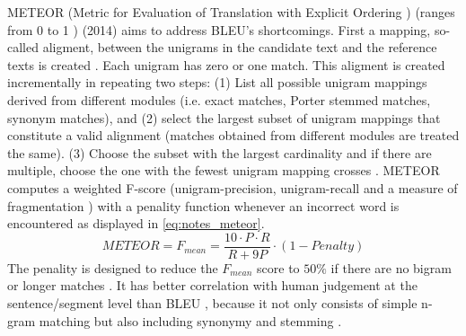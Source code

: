 METEOR (Metric for Evaluation of Translation with Explicit Ordering \cite{palivela_optimization_2021,banerjee_METEOR_2005}) 
(ranges from 0 to 1 \cite{kurt_pehlivanoglu_comparative_2024}) (2014) aims to address BLEU's shortcomings.
First a mapping, so-called aligment, between the unigrams in the candidate text and the reference texts is created \cite{banerjee_METEOR_2005}.
Each unigram has zero or one match.
This aligment is created incrementally in repeating two steps:
(1) List all possible unigram mappings derived from different modules (i.e. exact matches, Porter stemmed matches, synonym matches), 
and (2) select the largest subset of unigram mappings that constitute a valid alignment (matches obtained from different modules are treated the same).
(3) Choose the subset with the largest cardinality and if there are multiple, choose the one with the fewest unigram mapping crosses \cite{banerjee_METEOR_2005}.
METEOR computes a weighted F-score 
(unigram-precision, unigram-recall \cite{kurt_pehlivanoglu_comparative_2024,banerjee_METEOR_2005} 
and a measure of fragmentation \cite{banerjee_METEOR_2005,kurt_pehlivanoglu_comparative_2024})
with a penality function whenever an incorrect word is encountered \cite{palivela_optimization_2021} as displayed in \autoref{eq:notes_meteor}.
\begin{equation}
    METEOR = F_{mean} = \frac{10 \cdot P \cdot R}{R + 9P} \cdot (1 - Penalty)
\label{eq:notes_meteor}
\end{equation}
The penality is designed to reduce the $F_{mean}$ score to $50\%$ if there are no bigram or longer matches \cite{banerjee_METEOR_2005}.
It has better correlation with human judgement at the sentence/segment level than BLEU \cite{zhou_paraphrase_2021}, 
because it not only consists of simple n-gram matching but also including synonymy and stemming \cite{kurt_pehlivanoglu_comparative_2024}.

